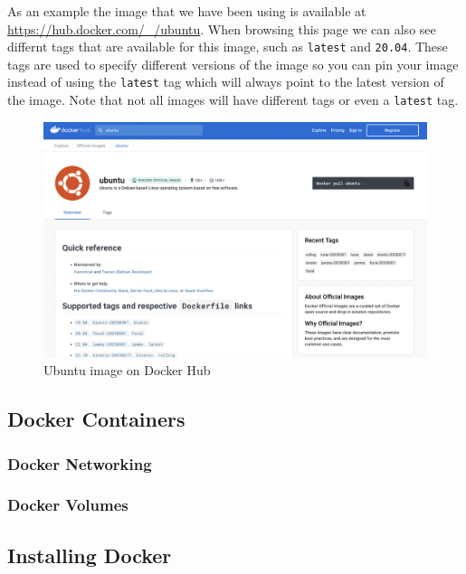 \documentclass{csse4400}
\begin{document}
As an example the image that we have been using is available at \url{https://hub.docker.com/_/ubuntu}. When browsing this page we can also see differnt tags that are available for this image, such as \texttt{latest} and \texttt{20.04}. These tags are used to specify different versions of the image so you can pin your image instead of using the \texttt{latest} tag which will always point to the latest version of the image. Note that not all images will have different tags or even a \texttt{latest} tag.

\begin{figure}[H]
  \includegraphics[width=\textwidth]{images/dockerhub}
  \caption{Ubuntu image on Docker Hub}
\end{figure}

\subsection{Docker Containers}


\subsubsection{Docker Networking}


\subsubsection{Docker Volumes}


\subsection{Installing Docker}
\end{document}
